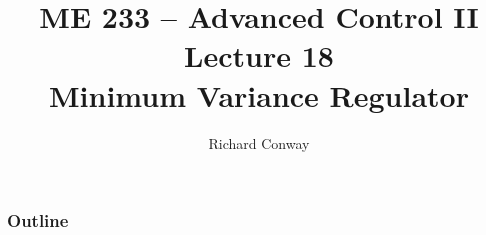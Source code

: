 \documentclass[handout,mathserif]{beamer}       %
\title{ME 233 -- Advanced Control II\\
    Lecture 18 \\
    Minimum Variance Regulator}
\author{Richard Conway}
\institute{UC Berkeley}
\begin{document}
\maketitle

\begin{frame}
    \frametitle{Outline}
    \tableofcontents
\end{frame}







\end{document}

